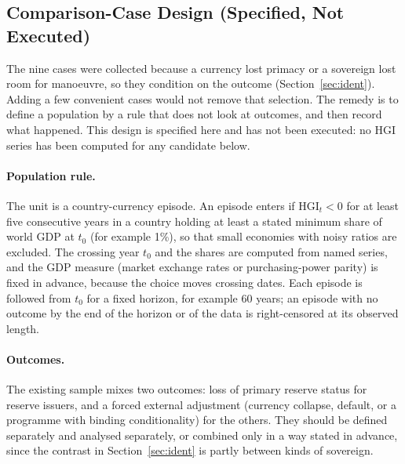 \documentclass[11pt,letterpaper]{article}
\theoremstyle{definition}
\theoremstyle{plain}
\newcommand{\HGI}{\mathrm{HGI}}
\begin{document}
\subsection{Comparison-Case Design (Specified, Not Executed)}\label{sec:compcase}
The nine cases were collected because a currency lost primacy or a sovereign lost room for manoeuvre, so they condition on the outcome (Section~\ref{sec:ident}). Adding a few convenient cases would not remove that selection. The remedy is to define a population by a rule that does not look at outcomes, and then record what happened. This design is specified here and has not been executed: no HGI series has been computed for any candidate below.

\paragraph{Population rule.} The unit is a country-currency episode. An episode enters if $\HGI_t<0$ for at least five consecutive years in a country holding at least a stated minimum share of world GDP at $t_0$ (for example 1\%), so that small economies with noisy ratios are excluded. The crossing year $t_0$ and the shares are computed from named series, and the GDP measure (market exchange rates or purchasing-power parity) is fixed in advance, because the choice moves crossing dates. Each episode is followed from $t_0$ for a fixed horizon, for example 60 years; an episode with no outcome by the end of the horizon or of the data is right-censored at its observed length.

\paragraph{Outcomes.} The existing sample mixes two outcomes: loss of primary reserve status for reserve issuers, and a forced external adjustment (currency collapse, default, or a programme with binding conditionality) for the others. They should be defined separately and analysed separately, or combined only in a way stated in advance, since the contrast in Section~\ref{sec:ident} is partly between kinds of sovereign.
\end{document}
